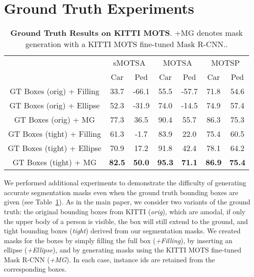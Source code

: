 \documentclass[10pt,twocolumn,letterpaper]{article}
\newcounter{row}
\begin{document}
\section{Ground Truth Experiments}

\begin{table}[t]
\setlength{\tabcolsep}{4pt}
\begin{centering}
\begin{tabular}{ccccccc}
\toprule
\multirow{2}{*}{} & \multicolumn{2}{c}{{\scriptsize{}sMOTSA}} & \multicolumn{2}{c}{{\scriptsize{}MOTSA}} & \multicolumn{2}{c}{{\scriptsize{}MOTSP}}\tabularnewline
 & {\scriptsize{}Car} & {\scriptsize{}Ped} & {\scriptsize{}Car} & {\scriptsize{}Ped} & {\scriptsize{}Car} & {\scriptsize{}Ped}\tabularnewline
\midrule
{\footnotesize{}GT Boxes (orig) + Filling} & {\footnotesize{}33.7} & {\footnotesize{}-66.1} & {\footnotesize{55.5}} & {\footnotesize{}-57.7} & {\footnotesize{}71.8} & {\footnotesize{}54.6}\tabularnewline
{\footnotesize{}GT Boxes (orig) + Ellipse} & {\footnotesize{}52.3} & {\footnotesize{}-31.9} & {\footnotesize{}74.0} & {\footnotesize{}-14.5} & {\footnotesize{}74.9} & {\footnotesize{}57.4}\tabularnewline
{\footnotesize{}GT Boxes (orig) + MG} & {\footnotesize{}77.3} & {\footnotesize{36.5}} & {\footnotesize{}90.4} & {\footnotesize{}55.7} & {\footnotesize{}86.3} & {\footnotesize{}75.3}\tabularnewline
{\footnotesize{}GT Boxes (tight) + Filling} & {\footnotesize{}61.3} & {\footnotesize{}-1.7} & {\footnotesize{}83.9} & {\footnotesize{}22.0} & {\footnotesize{}75.4} & {\footnotesize{}60.5}\tabularnewline
{\footnotesize{}GT Boxes (tight) + Ellipse} & {\footnotesize{}70.9} & {\footnotesize{}17.2} & {\footnotesize{}91.8} & {\footnotesize{}42.4} & {\footnotesize{}78.1} & {\footnotesize{}64.2}\tabularnewline
{\footnotesize{}GT Boxes (tight) + MG} & {\footnotesize{} \textbf{82.5}} & {\footnotesize{} \textbf{50.0}} & {\footnotesize{} \textbf{95.3}} & {\footnotesize{} \textbf{71.1}} & {\footnotesize{} \textbf{86.9}} & {\footnotesize{} \textbf{75.4}}\tabularnewline
\bottomrule
\end{tabular}
\par\end{centering}
\caption{\label{tab:results-kitti-gt}\textbf{Ground Truth Results on KITTI MOTS}. +MG denotes mask generation with a KITTI MOTS fine-tuned Mask R-CNN..}
\end{table}

We performed additional experiments to demonstrate the difficulty of generating accurate segmentation masks even when the ground truth bounding boxes are given (see Table~\ref{tab:results-kitti-gt}).
As in the main paper, we consider two variants of the ground truth: the original bounding boxes from KITTI (\textit{orig}), which are amodal, \ie if only the upper body of a person is visible, the box will still extend to the ground, and tight bounding boxes (\textit{tight}) derived from our segmentation masks.
We created masks for the boxes by simply filling the full box (\textit{+Filling}), by inserting an ellipse (\textit{+Ellipse}), and by generating masks using the KITTI MOTS fine-tuned Mask R-CNN (\textit{+MG}). In each case, instance ids are retained from the corresponding boxes.
\end{document}
